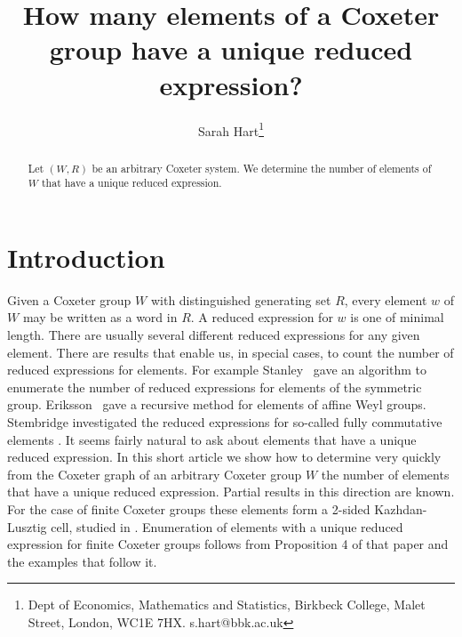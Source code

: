 \documentclass[a4paper,12pt]{article}
\theoremstyle{definition}
\begin{document}
    \title{\Large\textbf{How many elements of a Coxeter group have a unique reduced expression?}}
\date{}
      \author{Sarah Hart\thanks{\noindent Dept of Economics, Mathematics and
      Statistics,
Birkbeck College, Malet Street, London, WC1E 7HX. \hspace*{4mm}
s.hart@bbk.ac.uk}}
  \maketitle
 \vspace*{-10mm}
\begin{abstract}
Let $(W,R)$ be an arbitrary Coxeter system. We determine the number of elements of $W$ that have a unique reduced expression.
\end{abstract}
 \section{Introduction}
 
 Given a Coxeter group $W$ with distinguished generating set $R$, every element $w$ of $W$ may be written as a word in $R$. A reduced expression for $w$ is one of minimal length. There are usually several different reduced expressions for any given element. There are results that enable us, in special cases, to count the number of reduced expressions for elements. For example Stanley~\cite{stanley84} gave an algorithm to enumerate the number of reduced expressions for elements of the symmetric group. Eriksson~\cite{eriksson} gave a recursive method for elements of affine Weyl groups. Stembridge investigated the reduced expressions for so-called fully commutative elements \cite{stembridge}. It seems fairly natural to ask about elements that have a unique reduced expression. In this short article we show how to determine very quickly from the Coxeter graph of an arbitrary Coxeter group $W$ the number of elements that have a unique reduced expression. Partial results in this direction are known. For the case of finite Coxeter groups these elements form a 2-sided Kazhdan-Lusztig cell, studied in \cite{cells}. Enumeration of elements with a unique reduced expression for finite Coxeter groups follows from Proposition 4 of that paper and the examples that follow it. 
 
   
 
\end{document}
